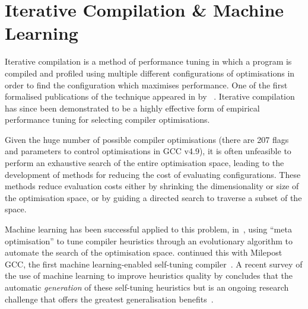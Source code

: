 \section{Iterative Compilation \& Machine Learning}\label{sec:iterative-compilation}



Iterative compilation is a method of performance tuning in which a
program is compiled and profiled using multiple different
configurations of optimisations in order to find the configuration
which maximises performance. One of the first formalised
publications of the technique appeared in \citeyear{Bodin1998} by
\citeauthor{Bodin1998}~\cite{Bodin1998}.  Iterative compilation has
since been demonstrated to be a highly effective form of empirical
performance tuning for selecting compiler optimisations.


Given the huge number of possible compiler optimisations (there are
207 flags and parameters to control optimisations in GCC v4.9), it is
often unfeasible to perform an exhaustive search of the entire
optimisation space, leading to the development of methods for reducing
the cost of evaluating configurations. These methods reduce evaluation
costs either by shrinking the dimensionality or size of the
optimisation space, or by guiding a directed search to traverse a
subset of the space.

Machine learning has been successful applied to this problem,
in~\cite{Stephenson2003}, using ``meta optimisation'' to tune compiler
heuristics through an evolutionary algorithm to automate the search of
the optimisation space. \citeauthor{Fursin2011} continued this with
Milepost GCC, the first machine learning-enabled self-tuning
compiler~\cite{Fursin2011}. A recent survey of the use of machine
learning to improve heuristics quality by \citeauthor{Burke2013}
concludes that the automatic \emph{generation} of these self-tuning
heuristics but is an ongoing research challenge that offers the
greatest generalisation benefits~\cite{Burke2013}.

